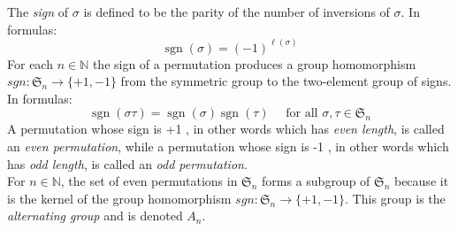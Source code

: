 \documentclass[a4paper, 10pt]{article}
\begin{document}
\begin{multicols*}{3}
The \textit{sign} of $\sigma$ is defined to be the parity of the number of inversions of $\sigma$. In formulas:\\
$$
\operatorname{sgn}(\sigma)=(-1)^{\ell(\sigma)}
$$
For each $n \in \mathbb{N}$ the sign of a permutation produces a group homomorphism $sgn : \mathfrak{S}_n \rightarrow\{+1,-1\}$ from the symmetric group to the two-element group of signs. 
In formulas:\\
$$
\operatorname{sgn}(\sigma \tau)=\operatorname{sgn}(\sigma) \operatorname{sgn}(\tau) \quad \text { for all } \sigma, \tau \in \mathfrak{S}_n
$$
A permutation whose sign is +1 , in other words which has \textit{even length}, is called an \textit{even permutation}, while a permutation whose sign is -1 , in other words which has \textit{odd length}, is called an \textit{odd permutation}.\\
For $n \in \mathbb{N}$, the set of even permutations in $\mathfrak{S}_n$ forms a subgroup of $\mathfrak{S}_n$ because it is the kernel of the group homomorphism $sgn : \mathfrak{S}_n \rightarrow\{+1,-1\}$. 
This group is the \textit{alternating group} and is denoted $A_n$.


\end{multicols*}
\end{document}
